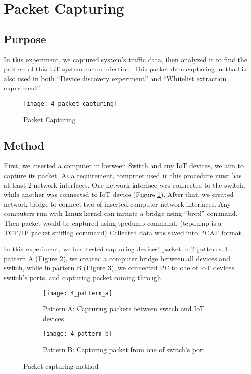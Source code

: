 \section{Packet Capturing}
\label{packet_capture}
\subsection{Purpose}
In this experiment, we captured system's traffic data, then analyzed it to find the pattern of this IoT system communication. This packet data capturing method is also used in both “Device discovery experiment” and “Whitelist extraction experiment”. 

\begin{figure}[h]
    \centering 
    \texttt{[image: 4\_packet\_capturing]}
    \caption{Packet Capturing}
    \label{fig:s4_packet_capturing}
\end{figure}


\subsection{Method}
First, we inserted a computer in between Switch and any IoT devices, we aim to capture its packet. As a requirement, computer used in this procedure must has at least 2 network interfaces. One network interface was connected to the switch, while another was connected to IoT device (Figure \ref{fig:s4_packet_capturing}). After that, we created network bridge to connect two of inserted computer network interfaces. Any computers run with Linux kernel can initiate a bridge using “brctl” command. Then packet would be captured using tpcdump command. (tcpdump is a TCP/IP packet sniffing command) Collected data was saved into PCAP format. 

In this experiment, we had tested capturing devices’ packet in 2 patterns. In pattern A (Figure \ref{fig:s4_pattern_a}), we created a computer bridge between all devices and switch, while in pattern B (Figure \ref{fig:s4_pattern_b}), we connected PC to one of IoT devices switch’s ports, and capturing packet coming through.

\begin{figure}[h]
    \centering
    \begin{subfigure}[b]{0.35\textwidth}
        \centering
        \texttt{[image: 4\_pattern\_a]}
        \caption{Pattern A: Capturing packets between switch and IoT devices}
        \label{fig:s4_pattern_a}
    \end{subfigure}
    \hspace{1.5cm}
    \begin{subfigure}[b]{0.35\textwidth}
        \centering
        \texttt{[image: 4\_pattern\_b]}
        \caption{Pattern B: Capturing packet from one of switch's port}
        \label{fig:s4_pattern_b}
    \end{subfigure}
    \caption{Packet capturing method}
    \label{fig:s4_patterns}
\end{figure}



